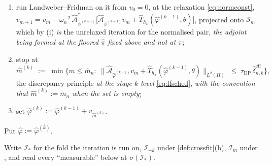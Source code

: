 \begin{definition}
\begin{enumerate}
\item[(b)] run Landweber--Fridman on it from $v_0=0$, at the relaxation \eqref{eq:normconst},
$v_{m+1}=v_m-\omega_n^{-2}\,\hat{\mathcal A}^\ast_{\hat\varphi^{(k-1)}}\big[\hat{\mathcal A}_{\hat\varphi^{(k-1)}}v_m
+\hat T_{h_x}(\hat\varphi^{(k-1)},\theta)\big]$, projected onto $\mathcal S_n$, which by
(i) \emph{is} the unrelaxed iteration for the normalised pair, \emph{the
adjoint being formed at the floored $\hat\pi$ fixed above and not at $\pi$};
\item[(c)] stop at
\[
\hat m^{(k)}\;:=\;\min\Big\{m\le\bar m_n:\ \big\|\hat{\mathcal A}_{\hat\varphi^{(k-1)}}v_m
+\hat T_{h_x}(\hat\varphi^{(k-1)},\theta)\big\|_{L^{2}(\Pi)}\;\le\;
\tau_{\mathrm{DP}}\,\hat\delta^{\mathrm{eff}}_{n,k}\Big\},
\]
the discrepancy principle \emph{at the stage-$k$ level} \eqref{eq:lfsched}, \emph{with the convention
that $\hat m^{(k)}:=\bar m_n$ when the set is empty};
\item[(d)] set $\hat\varphi^{(k)}:=\hat\varphi^{(k-1)}+v_{\hat m^{(k)}}$.
\end{enumerate}
Put $\hat\varphi:=\hat\varphi^{(\bar k)}$.

Write $\mathcal I_\ast$ for the fold the iteration is run on, $\mathcal I_{-k}$ under
\cref{def:crossfit}\textup{(b)}, $\mathcal I_m$ under , and read every ``measurable''
below at $\sigma(\mathcal I_\ast)$.


\end{definition}
